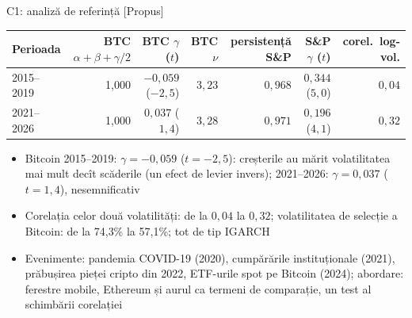 \ifsolutions
\begin{frame}{C1: analiză de referință [Propus]}
\itemsize{\footnotesize}
\begin{center}
\scriptsize
\begin{tabular}{lrrrrrr}
\toprule
Perioada & BTC $\alpha + \beta + \gamma/2$ & BTC $\gamma$ ($t$) & BTC $\nu$ & persistență S\&P & S\&P $\gamma$ ($t$) & corel.\ log-vol. \\
\midrule
2015--2019 & 1{,}000 & $-0{,}059$ ($-2{,}5$) & $3{,}23$ & $0{,}968$ & $0{,}344$ ($5{,}0$) & $0{,}04$ \\
2021--2026 & 1{,}000 & $0{,}037$ ($1{,}4$) & $3{,}28$ & $0{,}971$ & $0{,}196$ ($4{,}1$) & $0{,}32$ \\
\bottomrule
\end{tabular}
\end{center}
\begin{itemize}
    \item Bitcoin 2015--2019: $\gamma = -0{,}059$ ($t = -2{,}5$): creșterile au mărit volatilitatea mai mult decît scăderile (un efect de levier invers); 2021--2026: $\gamma = 0{,}037$ ($t = 1{,}4$), nesemnificativ
    \item Corelația celor două volatilități: de la $0{,}04$ la $0{,}32$; volatilitatea de selecție a Bitcoin: de la 74{,}3\% la 57{,}1\%; tot de tip IGARCH
    \item Evenimente: pandemia COVID-19 (2020), cumpărările instituționale (2021), prăbușirea pieței cripto din 2022, ETF-urile spot pe Bitcoin (2024); abordare: ferestre mobile, Ethereum și aurul ca termeni de comparație, un test al schimbării corelației
\end{itemize}
\end{frame}
\fi

